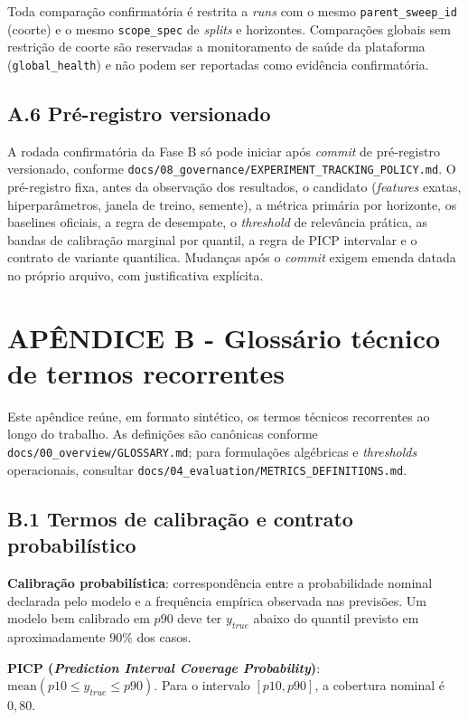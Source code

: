 Toda comparação confirmatória é restrita a \textit{runs} com o mesmo \texttt{parent\_sweep\_id} (coorte) e o mesmo \texttt{scope\_spec} de \textit{splits} e horizontes. Comparações globais sem restrição de coorte são reservadas a monitoramento de saúde da plataforma (\texttt{global\_health}) e não podem ser reportadas como evidência confirmatória.

\section*{A.6 Pré-registro versionado}

A rodada confirmatória da Fase B só pode iniciar após \textit{commit} de pré-registro versionado, conforme \texttt{docs/08\_governance/EXPERIMENT\_TRACKING\_POLICY.md}. O pré-registro fixa, antes da observação dos resultados, o candidato (\textit{features} exatas, hiperparâmetros, janela de treino, semente), a métrica primária por horizonte, os baselines oficiais, a regra de desempate, o \textit{threshold} de relevância prática, as bandas de calibração marginal por quantil, a regra de PICP intervalar e o contrato de variante quantilica. Mudanças após o \textit{commit} exigem emenda datada no próprio arquivo, com justificativa explícita.

\chapter*{APÊNDICE B - Glossário técnico de termos recorrentes}

Este apêndice reúne, em formato sintético, os termos técnicos recorrentes ao longo do trabalho. As definições são canônicas conforme \texttt{docs/00\_overview/GLOSSARY.md}; para formulações algébricas e \textit{thresholds} operacionais, consultar \texttt{docs/04\_evaluation/METRICS\_DEFINITIONS.md}.

\section*{B.1 Termos de calibração e contrato probabilístico}

\textbf{Calibração probabilística}: correspondência entre a probabilidade nominal declarada pelo modelo e a frequência empírica observada nas previsões. Um modelo bem calibrado em \(p90\) deve ter \(y_{\textit{true}}\) abaixo do quantil previsto em aproximadamente \(90\%\) dos casos.

\textbf{PICP (\textit{Prediction Interval Coverage Probability})}: \(\text{mean}(p10 \leq y_{\textit{true}} \leq p90)\). Para o intervalo \([p10, p90]\), a cobertura nominal é \(0{,}80\).


